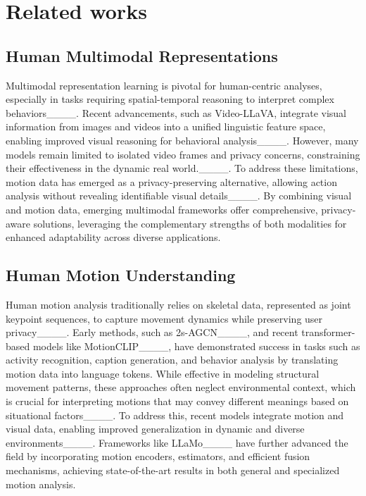 \section{Related works}
\subsection{Human Multimodal Representations}

Multimodal representation learning is pivotal for human-centric analyses, especially in tasks requiring spatial-temporal reasoning to interpret complex behaviors____. Recent advancements, such as Video-LLaVA, integrate visual information from images and videos into a unified linguistic feature space, enabling improved visual reasoning for behavioral analysis____. However, many models remain limited to isolated video frames and privacy concerns, constraining their effectiveness in the dynamic real world.____. To address these limitations, motion data has emerged as a privacy-preserving alternative, allowing action analysis without revealing identifiable visual details____. By combining visual and motion data, emerging multimodal frameworks offer comprehensive, privacy-aware solutions, leveraging the complementary strengths of both modalities for enhanced adaptability across diverse applications.

\subsection{Human Motion Understanding}

Human motion analysis traditionally relies on skeletal data, represented as joint keypoint sequences, to capture movement dynamics while preserving user privacy____. Early methods, such as 2s-AGCN____, and recent transformer-based models like MotionCLIP____, have demonstrated success in tasks such as activity recognition, caption generation, and behavior analysis by translating motion data into language tokens. While effective in modeling structural movement patterns, these approaches often neglect environmental context, which is crucial for interpreting motions that may convey different meanings based on situational factors____. To address this, recent models integrate motion and visual data, enabling improved generalization in dynamic and diverse environments____. Frameworks like LLaMo____ have further advanced the field by incorporating motion encoders, estimators, and efficient fusion mechanisms, achieving state-of-the-art results in both general and specialized motion analysis.

